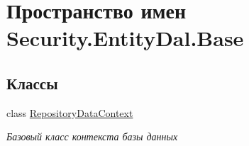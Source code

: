 \hypertarget{namespace_security_1_1_entity_dal_1_1_base}{}\section{Пространство имен Security.\+Entity\+Dal.\+Base}
\label{namespace_security_1_1_entity_dal_1_1_base}
\subsection*{Классы}
\begin{DoxyCompactItemize}
\item 
class \hyperlink{class_security_1_1_entity_dal_1_1_base_1_1_repository_data_context}{Repository\+Data\+Context}
\begin{DoxyCompactList}\small\item\em Базовый класс контекста базы данных \end{DoxyCompactList}\end{DoxyCompactItemize}
